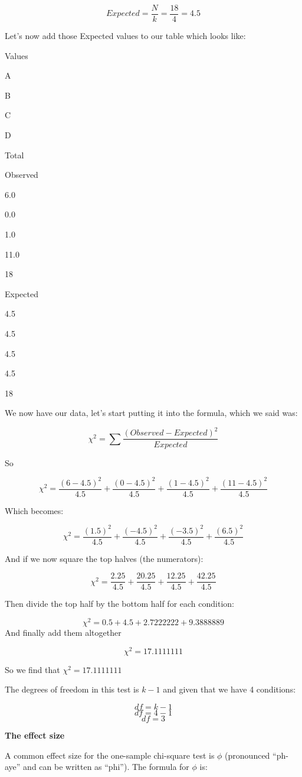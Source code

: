 \documentclass[
  oneside]{book}
\begin{document}
\[Expected = \frac{N}{k} = \frac{18}{4} = 4.5\]

Let's now add those Expected values to our table which looks like:

Values

A

B

C

D

Total

Observed

6.0

0.0

1.0

11.0

18

Expected

4.5

4.5

4.5

4.5

18

We now have our data, let's start putting it into the formula, which we said was:

\[\chi^2 = \sum\frac{(Observed - Expected)^2}{Expected}\]

So

\[\chi^2 = \frac{(6 - 4.5)^2}{4.5}+\frac{(0 - 4.5)^2}{4.5}+\frac{(1 - 4.5)^2}{4.5}+\frac{(11 - 4.5)^2}{4.5}\]

Which becomes:

\[\chi^2 = \frac{(1.5)^2}{4.5} + \frac{(-4.5)^2}{4.5} + \frac{(-3.5)^2}{4.5} + \frac{(6.5)^2}{4.5}\]

And if we now square the top halves (the numerators):

\[\chi^2 = \frac{2.25}{4.5} + \frac{20.25}{4.5} + \frac{12.25}{4.5} + \frac{42.25}{4.5}\]

Then divide the top half by the bottom half for each condition:

\[\chi^2 = {0.5}+{4.5}+{2.7222222}+{9.3888889}\]
And finally add them altogether

\[\chi^2 = 17.1111111\]

So we find that \(\chi^2 = 17.1111111\)

The degrees of freedom in this test is \(k - 1\) and given that we have 4 conditions:

\[df = k - 1\]
\[df = 4 - 1\]
\[df = 3\]

\textbf{The effect size}

A common effect size for the one-sample chi-square test is \(\phi\) (pronounced ``ph-aye'' and can be written as ``phi''). The formula for \(\phi\) is:
\end{document}
